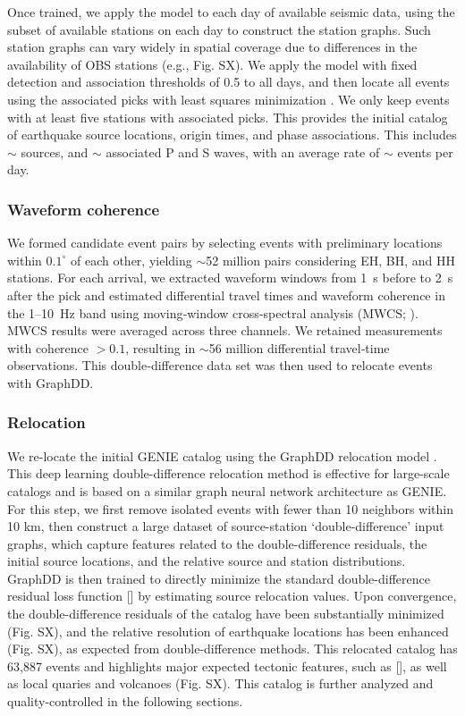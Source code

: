 \documentclass[review]{seismica}
\begin{document}
Once trained, we apply the model to each day of available seismic data,
using the subset of available stations on each day to construct the
station graphs. Such station graphs can vary widely in spatial coverage
due to differences in the availability of OBS stations (e.g., Fig. SX).
We apply the model with fixed detection and association thresholds of
0.5 to all days, and then locate all events using the associated picks
with least squares minimization \citep{lomax2000probabilistic}. We only
keep events with at least five stations with associated picks. This
provides the initial catalog of earthquake source locations, origin
times, and phase associations. This includes \ensuremath{\sim} sources,
and \ensuremath{\sim} associated P and S waves, with an average rate of
\ensuremath{\sim} events per day.

\subsubsection{Waveform coherence}\label{waveform-coherence}

We formed candidate event pairs by selecting events with preliminary
locations within \(0.1^\circ\) of each other, yielding
\ensuremath{\sim}52 million pairs considering EH, BH, and HH stations.
For each arrival, we extracted waveform windows from 1~s before to 2~s
after the pick and estimated differential travel times and waveform
coherence in the 1--10~Hz band using moving‑window cross‑spectral
analysis (MWCS; \citep{poupinet_monitoring_1984}). MWCS results were
averaged across three channels. We retained measurements with coherence
\(>0.1\), resulting in \ensuremath{\sim}56 million differential
travel‑time observations. This double‑difference data set was then used
to relocate events with GraphDD.

\subsubsection{Relocation}\label{relocation}

We re-locate the initial GENIE catalog using the GraphDD relocation
model \citep{mcbrearty2024double}. This deep learning double-difference
relocation method is effective for large-scale catalogs and is based on
a similar graph neural network architecture as GENIE. For this step, we
first remove isolated events with fewer than 10 neighbors within 10 km,
then construct a large dataset of source-station `double-difference'
input graphs, which capture features related to the double-difference
residuals, the initial source locations, and the relative source and
station distributions. GraphDD is then trained to directly minimize the
standard double-difference residual loss function {[}{]} by estimating
source relocation values. Upon convergence, the double-difference
residuals of the catalog have been substantially minimized (Fig. SX),
and the relative resolution of earthquake locations has been enhanced
(Fig. SX), as expected from double-difference methods. This relocated
catalog has 63,887 events and highlights major expected tectonic
features, such as {[}{]}, as well as local quaries and volcanoes (Fig.
SX). This catalog is further analyzed and quality-controlled in the
following sections.
\end{document}
